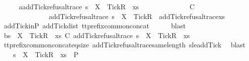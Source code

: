 \begin{isabellebody}
\isanewline
\ \ \isamarkupfalse%
\ \isamarkupfalse%
\ a{\isacharcolon}{\isachardoublequoteopen}add{\isacharunderscore}Tick{\isacharunderscore}refusal{\isacharunderscore}trace\ s\ {\isacharat}\ {\isacharbrackleft}{\isacharbrackleft}X\ {\isasymunion}\ {\isacharbraceleft}Tick{\isacharbraceright}{\isacharbrackright}\isactrlsub R{\isacharbrackright}\ {\isacharat}\ xs\isanewline
\ \ \ \ \ \ \ \ \ \ \ \ \ \ {\isasymlesssim}\isactrlsub C\isanewline
\ \ \ \ \ \ \ \ \ \ \ \ \ \ add{\isacharunderscore}Tick{\isacharunderscore}refusal{\isacharunderscore}trace\ s\ {\isacharat}\ {\isacharbrackleft}{\isacharbrackleft}X\ {\isasymunion}\ {\isacharbraceleft}Tick{\isacharbraceright}{\isacharbrackright}\isactrlsub R{\isacharbrackright}\ {\isacharat}\ add{\isacharunderscore}Tick{\isacharunderscore}refusal{\isacharunderscore}trace{\isacharparenleft}xs{\isacharparenright}{\isachardoublequoteclose}\isanewline
\ \ \isamarkupfalse%
\ add{\isacharunderscore}Tick{\isacharunderscore}in{\isacharunderscore}P\ add{\isacharunderscore}Tick{\isacharunderscore}dist\ tt{\isacharunderscore}prefix{\isacharunderscore}common{\isacharunderscore}concat\isanewline
\ \ \ \ \isamarkupfalse%
\ blast\isanewline
\ \ \isamarkupfalse%
\ \isamarkupfalse%
\ b{\isacharcolon}{\isachardoublequoteopen}s\ {\isacharat}\ {\isacharbrackleft}{\isacharbrackleft}X\ {\isasymunion}\ {\isacharbraceleft}Tick{\isacharbraceright}{\isacharbrackright}\isactrlsub R{\isacharbrackright}\ {\isacharat}\ xs\ {\isasymlesssim}\isactrlsub C\ add{\isacharunderscore}Tick{\isacharunderscore}refusal{\isacharunderscore}trace\ s\ {\isacharat}\ {\isacharbrackleft}{\isacharbrackleft}X\ {\isasymunion}\ {\isacharbraceleft}Tick{\isacharbraceright}{\isacharbrackright}\isactrlsub R{\isacharbrackright}\ {\isacharat}\ xs{\isachardoublequoteclose}\isanewline
\ \ \ \ \isamarkupfalse%
\ tt{\isacharunderscore}prefix{\isacharunderscore}common{\isacharunderscore}concat{\isacharunderscore}eq{\isacharunderscore}size\ add{\isacharunderscore}Tick{\isacharunderscore}refusal{\isacharunderscore}trace{\isacharunderscore}same{\isacharunderscore}length\ s{\isacharunderscore}le{\isacharunderscore}addTick\ \isamarkupfalse%
\ blast\isanewline
\isanewline
\ \ \isamarkupfalse%
\ {\isachardoublequoteopen}s\ {\isacharat}\ {\isacharbrackleft}{\isacharbrackleft}X\ {\isasymunion}\ {\isacharbraceleft}Tick{\isacharbraceright}{\isacharbrackright}\isactrlsub R{\isacharbrackright}\ {\isacharat}\ xs\ {\isasymin}\ P{\isachardoublequoteclose}\isanewline

\end{isabellebody}
